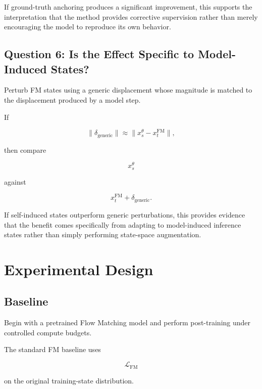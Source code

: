 \documentclass[11pt]{article}
\begin{document}
If ground-truth anchoring produces a significant improvement, this supports
the interpretation that the method provides corrective supervision rather than
merely encouraging the model to reproduce its own behavior.

\subsection{Question 6: Is the Effect Specific to Model-Induced States?}

Perturb FM states using a generic displacement whose magnitude is matched to
the displacement produced by a model step.

If

\begin{equation}
\|\delta_{\mathrm{generic}}\|
\approx
\|x_s^\theta-x_t^{\mathrm{FM}}\|,
\end{equation}

then compare

\begin{equation}
x_s^\theta
\end{equation}

against

\begin{equation}
x_t^{\mathrm{FM}}+\delta_{\mathrm{generic}}.
\end{equation}

If self-induced states outperform generic perturbations, this provides
evidence that the benefit comes specifically from adapting to model-induced
inference states rather than simply performing state-space augmentation.

\section{Experimental Design}

\subsection{Baseline}

Begin with a pretrained Flow Matching model and perform post-training under
controlled compute budgets.

The standard FM baseline uses

\begin{equation}
\mathcal{L}_{\mathrm{FM}}
\end{equation}

on the original training-state distribution.
\end{document}
